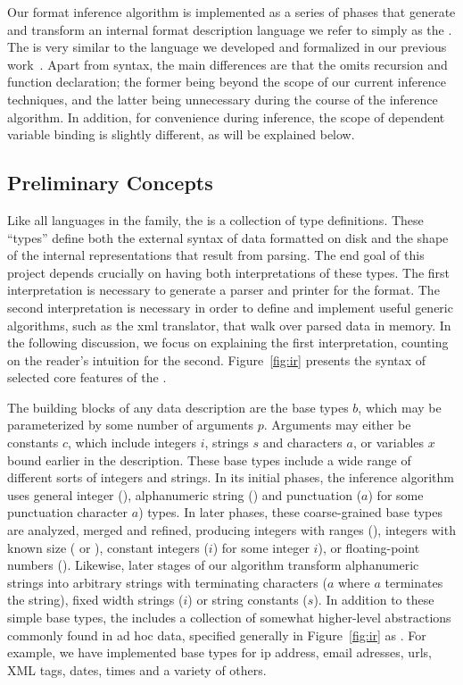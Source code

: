 Our format inference algorithm is implemented as a series of phases that
generate and transform an internal format description language we
refer to simply as the \ir.  The \ir{} is very similar to
the \ipads{} language we developed and formalized in our previous 
work~\cite{fisher+:popl06}.  Apart from syntax, the main differences 
are that the \ir{} omits recursion and function declaration; the former
being beyond the scope of our current inference techniques, and the 
latter being unnecessary during the course of the inference algorithm.  
In addition, for convenience during inference, the scope of dependent 
variable binding is slightly different, as will be explained below.

\subsection{Preliminary Concepts}

Like all languages in the \pads{} family, the \ir{} is a collection of
type definitions.  These ``types'' define both the external syntax of
data formatted on disk and the shape of the internal representations
that result from parsing.  The end goal of this project depends
crucially on having both interpretations of these types.  The first
interpretation is necessary to generate a
parser and printer for the format.  The second interpretation 
is necessary in order to define and
implement useful generic algorithms, such as the xml translator, that
walk over parsed data in memory.  In the following discussion, we focus on
explaining the first interpretation, counting on the reader's intuition 
for the second.  Figure~\ref{fig:ir} presents the syntax of
selected core features of the \ir{}.

The building blocks of any data description are the base types $b$,
which may be parameterized by some number of arguments $p$.  Arguments
may either be constants $c$, which include integers $i$, strings
$s$ and characters $a$, or variables $x$ bound earlier in the description.
These base types include a wide range of different sorts of
integers and strings.  In its initial phases, the inference algorithm
uses general integer (), alphanumeric string ()
and punctuation ($a$\cd{)}) for some punctuation 
character $a$) types.  In later phases,
these coarse-grained base types are analyzed, merged and refined, producing
integers with ranges (),
integers with known size ( or ), constant integers
($i$\cd{)}) for some integer $i$), or floating-point
numbers ().  Likewise, later stages of our algorithm transform
alphanumeric strings into arbitrary strings with terminating characters
($a$\cd{)} where $a$ terminates the string), fixed width
strings ($i$\cd{)}) or string constants 
($s$\cd{)}).  
In addition to these simple base types, the \ir{} includes a collection of
somewhat higher-level abstractions commonly found in ad hoc data, specified 
generally in Figure~\ref{fig:ir} as .  For example, we 
have implemented
base types for ip address, email adresses, urls, XML tags, dates, times and 
a variety of others.

